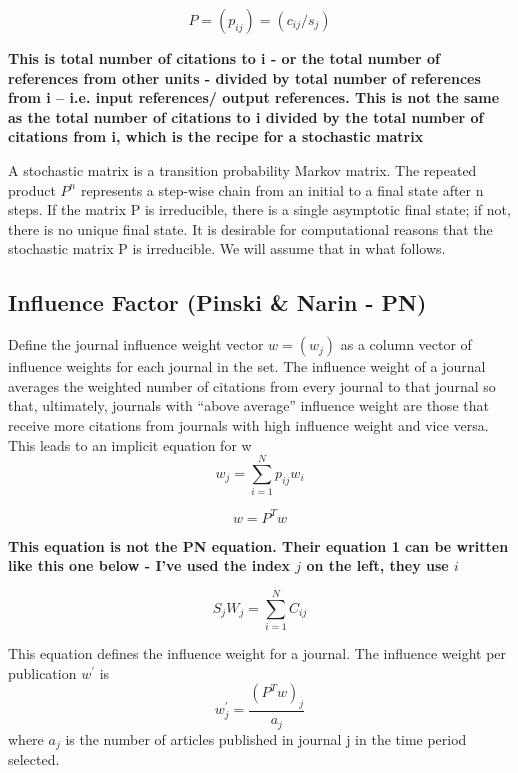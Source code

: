 \documentclass[10pt]{article}
\begin{document}
\begin{equation}
P = (p_{ij}) = (c_{ij}/s_j)
\end{equation}

\textbf{This is total number of citations to i - or the total number of references from other units -  divided by total number of references from i -- i.e. input references/ output references. This is not the same as the total number of citations to i divided by the total number of citations from i, which is the recipe for a stochastic matrix}

A stochastic matrix is a transition probability Markov matrix. The repeated product $P^n$ represents a step-wise chain from an initial to a final state
after n steps. If the matrix P is irreducible, there is a single asymptotic final state; if
not, there is no unique final state. It is desirable for computational reasons that the stochastic matrix P  is irreducible. We will assume that in what follows.

\subsection{Influence Factor (Pinski \& Narin - PN)}
Define the journal influence weight vector
$w = (w_j)$ as a column vector of influence weights for each journal in the set. The influence
weight of a journal averages the weighted number of citations from every journal to that
journal so that, ultimately, journals with ``above average'' influence weight are those that
receive more citations from journals with high influence weight and vice versa. This
leads to an implicit equation for w
\begin{equation}
w_j =   \sum_{i=1}^{N}p_{ij}w_i
\end{equation}

\begin{equation}
w = P^Tw
\end{equation}

\textbf{This equation is not the PN equation. Their equation 1 can be written like this one below - I've used the index $j$ on the left, they use $i$}

\begin{equation}
S_j W_j = \sum_{i=1}^{N}C_{ij}
\end{equation}



This equation defines the influence weight for a journal. The influence weight per
publication $w^{\prime}$ is
\begin{equation}
w^{\prime}_j =
\frac{(P^Tw)_j}{a_{j}}
\end{equation}
where $a_j$ is the number of articles published in journal j in the time period
selected.
\end{document}
